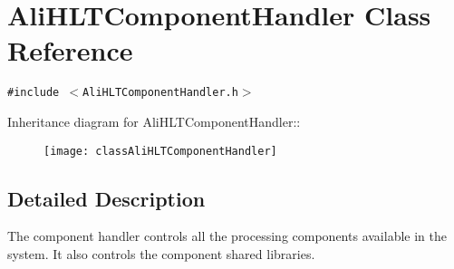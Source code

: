 \section{Ali\-HLTComponent\-Handler Class Reference}
\label{classAliHLTComponentHandler}
{\tt \#include $<$Ali\-HLTComponent\-Handler.h$>$}

Inheritance diagram for Ali\-HLTComponent\-Handler::\begin{figure}[H]
\begin{center}
\leavevmode
\texttt{[image: classAliHLTComponentHandler]}
\end{center}
\end{figure}


\subsection{Detailed Description}
The component handler controls all the processing components available in the system. It also controls the component shared libraries. 



